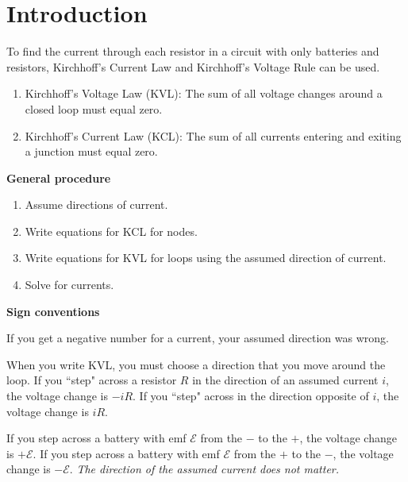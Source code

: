 \documentclass{article}
\begin{document}
\section{Introduction}

To find the current through each resistor in a circuit with only batteries and resistors, Kirchhoff's Current Law and Kirchhoff's Voltage Rule can be used.

\begin{enumerate}

  \item Kirchhoff's Voltage Law (KVL): The sum of all voltage changes around a closed loop must equal zero.

  \item Kirchhoff's Current Law (KCL): The sum of all currents entering and exiting a junction must equal zero.

\end{enumerate}

\textbf{General procedure}

\begin{enumerate}

  \item Assume directions of current.

  \item Write equations for KCL for nodes.

  \item Write equations for KVL for loops using the assumed direction of current.

  \item Solve for currents.

\end{enumerate}

\textbf{Sign conventions}

If you get a negative number for a current, your assumed direction was wrong.

When you write KVL, you must choose a direction that you move around the loop. If you ``step" across a resistor $R$ in the direction of an assumed current $i$, the voltage change is $-iR$. If you ``step" across in the direction opposite of $i$, the voltage change is $iR$.

If you step across a battery with emf $\mathcal{E}$ from the $-$ to the $+$, the voltage change is $+\mathcal{E}$. If you step across a battery with emf $\mathcal{E}$ from the $+$ to the $-$, the voltage change is $-\mathcal{E}$. \emph{The direction of the assumed current does not matter.}
\end{document}
